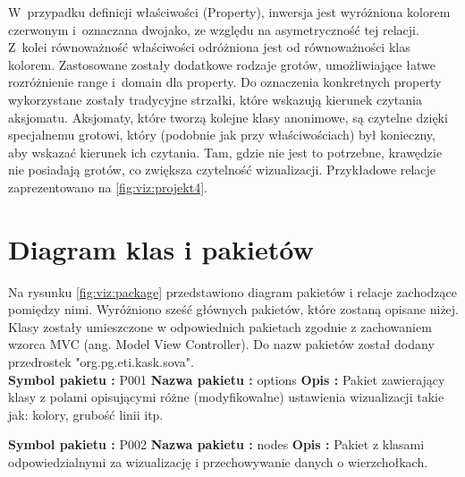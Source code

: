 
 W~przypadku definicji właściwości (Property), inwersja jest wyróżniona kolorem czerwonym i~oznaczana dwojako, ze względu na asymetryczność tej relacji. Z~kolei 
równoważność właściwości odróżniona jest od równoważności klas kolorem. Zastosowane zostały dodatkowe rodzaje grotów, umożliwiające łatwe rozróżnienie 
range i~domain dla property. Do oznaczenia konkretnych property wykorzystane zostały tradycyjne strzałki, które wskazują kierunek czytania  aksjomatu.
 Aksjomaty, które tworzą kolejne klasy anonimowe, są czytelne dzięki specjalnemu grotowi, który (podobnie jak przy właściwościach) był konieczny, aby wskazać 
kierunek ich czytania. Tam, gdzie nie jest to potrzebne, krawędzie nie posiadają grotów, co zwiększa czytelność wizualizacji. Przykładowe relacje 
zaprezentowano na \figurename \space \ref{fig:viz:projekt4}.



\section{Diagram klas i pakietów}
Na rysunku \figurename \space \ref{fig:viz:package} przedstawiono diagram pakietów i relacje zachodzące pomiędzy nimi. Wyróżniono sześć głównych
 pakietów, które zostaną opisane niżej.  Klasy zostały umieszczone w odpowiednich pakietach zgodnie z zachowaniem wzorca MVC (ang. Model View Controller).
Do nazw pakietów został dodany przedrostek "org.pg.eti.kask.sova". \\

\noindent 
{\bf Symbol pakietu :} P001 \newline
{\bf Nazwa pakietu :} options \newline
{\bf Opis :}  Pakiet zawierający klasy z polami opisującymi różne (modyfikowalne) ustawienia wizualizacji takie jak: kolory, grubość linii itp.  \newline

\noindent 
{\bf Symbol pakietu :} P002 \newline
{\bf Nazwa pakietu :} nodes \newline
{\bf Opis :} Pakiet z klasami odpowiedzialnymi za wizualizację i przechowywanie danych o wierzchołkach. \newline

